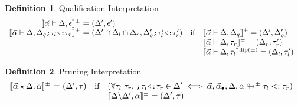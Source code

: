 \documentclass[acmsmall]{acmart}
\theoremstyle{definition}
\newtheorem{definition}{Definition}[section]
\begin{document}
\begin{definition} 
  \label{def:qualification_interpretation}
  Qualification Interpretation 
  \hfill
  \\
  \[
  \begin{array}[t]{r@{}c@{}lcl}
      \llbracket \vec{\alpha} \entails \Delta, \epsilon \rrbracket^\pm
      &\ =\ & 
      (\Delta', \epsilon')
      && 

      \\

      \llbracket \vec{\alpha} \entails \Delta, \Delta_q \J{;} \tau_l \J{<:} \tau_r \rrbracket^\pm
      &\ =\ & 
      (\Delta' \cap \Delta_l \cap \Delta_r, \Delta_q' \J{;} \tau_l' \J{<:} \tau_r')
      &\text{if}& 
      \begin{array}[t]{@{}l}
        \llbracket \vec{\alpha} \entails \Delta, \Delta_q\rrbracket^\pm = (\Delta', \Delta_q')
        \\
        \llbracket \vec{\alpha} \entails \Delta, \tau_r \rrbracket^\pm = (\Delta_r, \tau_r')
        \\
        \llbracket \vec{\alpha} \entails \Delta, \tau_l \rrbracket^{\text{flip}(\pm)} = (\Delta_l, \tau_l')
      \end{array}
  \end{array}
  \]
\end{definition} 



\begin{definition} 
  \label{def:pruning_interpretation}
  Pruning Interpretation 
  \hfill
  \\
  \[
  \begin{array}[t]{r@{}c@{}lcl}
      \llbracket \vec{\alpha} \star \Delta, \alpha \rrbracket^\pm
      &\ =\ & 
      (\Delta', \tau)
      &\text{if}& 
      \begin{array}[t]{@{}l}
        (\forall \tau_l\ \tau_r .\ \J{;} \tau_l \J{<:} \tau_r \in \Delta' \iff \vec{\alpha}, \vec{\alpha}_\bullet, \Delta, \alpha \looparrowright^\pm \tau_l \subtypes \tau_r)
        \\
        \llbracket \Delta\backslash\Delta', \alpha \rrbracket^\pm = (\Delta', \tau)
      \end{array}

      \\
  \end{array}
  \]
\end{definition}
\end{document}
